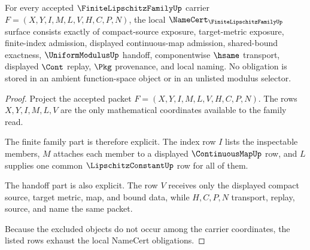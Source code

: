 \begin{theorem}
\label{thm:finite-lipschitz-family-namecert-obligations}
For every accepted $\FiniteLipschitzFamilyUp$ carrier $F=(X,Y,I,M,L,V,H,C,P,N)$, the local $\NameCert_{\FiniteLipschitzFamilyUp}$ surface consists exactly of compact-source exposure, target-metric exposure, finite-index admission, displayed continuous-map admission, shared-bound exactness, $\UniformModulusUp$ handoff, componentwise $\hsame$ transport, displayed $\Cont$ replay, $\Pkg$ provenance, and local naming. No obligation is stored in an ambient function-space object or in an unlisted modulus selector.
\end{theorem}
\begin{proof}
Project the accepted packet $F=(X,Y,I,M,L,V,H,C,P,N)$. The rows $X,Y,I,M,L,V$ are the only mathematical coordinates available to the family read.

The finite family part is therefore explicit. The index row $I$ lists the inspectable members, $M$ attaches each member to a displayed $\ContinuousMapUp$ row, and $L$ supplies one common $\LipschitzConstantUp$ row for all of them.

The handoff part is also explicit. The row $V$ receives only the displayed compact source, target metric, map, and bound data, while $H,C,P,N$ transport, replay, source, and name the same packet.

Because the excluded objects do not occur among the carrier coordinates, the listed rows exhaust the local NameCert obligations.
\end{proof}

